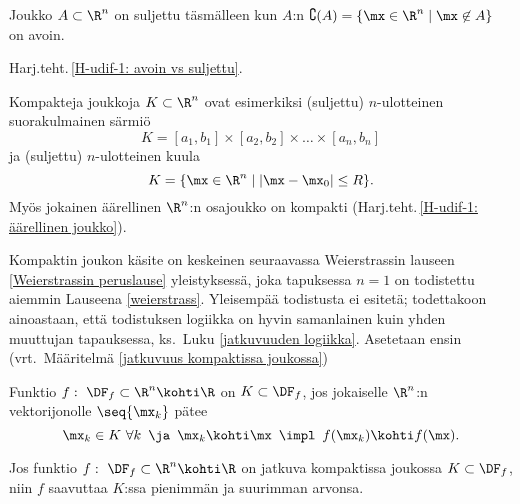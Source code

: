 \begin{Lause} \label{avoin vs suljettu - Rn} 
Joukko $A\subset\R^n$ on suljettu täsmälleen kun $A$:n 
$\complement(A)=\{\mx\in\R^n \mid \mx \not\in A\}$ on avoin.
\end{Lause}
\tod Harj.teht.\,\ref{H-udif-1: avoin vs suljettu}.
\begin{Exa} Kompakteja joukkoja $K\subset\R^n$ ovat esimerkiksi (suljettu) $n$-ulot\-teinen
suorakulmainen särmiö
\[
K=[a_1,b_1]\times[a_2,b_2]\times\ldots\times[a_n,b_n]
\]
ja (suljettu) $n$-ulotteinen kuula
\[
K = \{\mx\in\R^n \mid |\mx-\mx_0| \le R\}.
\]
Myös jokainen äärellinen $\R^n$:n osajoukko on kompakti
(Harj.teht.\,\ref{H-udif-1: äärellinen joukko}). \loppu
\end{Exa}
Kompaktin joukon käsite on keskeinen seuraavassa Weierstrassin lauseen
\ref{Weierstrassin peruslause} yleistyksessä, joka tapuksessa $n=1$ on todistettu aiemmin
Lauseena \ref{weierstrass}. Yleisempää todistusta ei esitetä; todettakoon ainoastaan, että
todistuksen logiikka on hyvin samanlainen kuin yhden muuttujan tapauksessa, ks.\ Luku
\ref{jatkuvuuden logiikka}. Asetetaan ensin (vrt.\ Määritelmä
\ref{jatkuvuus kompaktissa joukossa})
\begin{Def} \label{jatkuvuus kompaktissa joukossa - Rn} 
Funktio $f:\ \DF_f\subset\R^n\kohti\R$ on  $K\subset\DF_f$,
jos jokaiselle $\R^n$:n vektorijonolle $\seq{\mx_k}$ pätee
\[
\mx_k \in K\ \forall k\,\ \ja\,\ \mx_k \kohti \mx\,\ \impl\,\ f(\mx_k) \kohti f(\mx).
\]
\end{Def}
\begin{*Lause} \label{weierstrass - Rn} 
Jos funktio $f:\ \DF_f\subset\R^n\kohti\R$ on jatkuva
kompaktissa joukossa $K\subset\DF_f$, niin $f$ saavuttaa $K$:ssa pienimmän ja suurimman arvonsa.
\end{*Lause}

